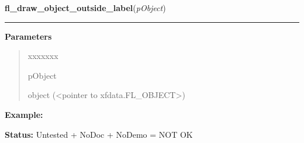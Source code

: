     \label{xformslib:library:fl_draw_object_label_outside}

    \vspace{0.5ex}

\hspace{.8\funcindent}\begin{boxedminipage}{\funcwidth}

    \raggedright \textbf{fl\_draw\_object\_outside\_label}(\textit{pObject})

    \vspace{-1.5ex}

    \rule{\textwidth}{0.5\fboxrule}
\setlength{\parskip}{2ex}
\setlength{\parskip}{1ex}
      \textbf{Parameters}
      \vspace{-1ex}

      \begin{quote}
        \begin{Ventry}{xxxxxxx}

          \item[pObject]

          object ({\textless}pointer to xfdata.FL\_OBJECT{\textgreater})

        \end{Ventry}

      \end{quote}

\textbf{Example:} 

\textbf{Status:} Untested + NoDoc + NoDemo = NOT OK



    \end{boxedminipage}

    \label{xformslib:library:fl_get_object_component}

    \vspace{0.5ex}

